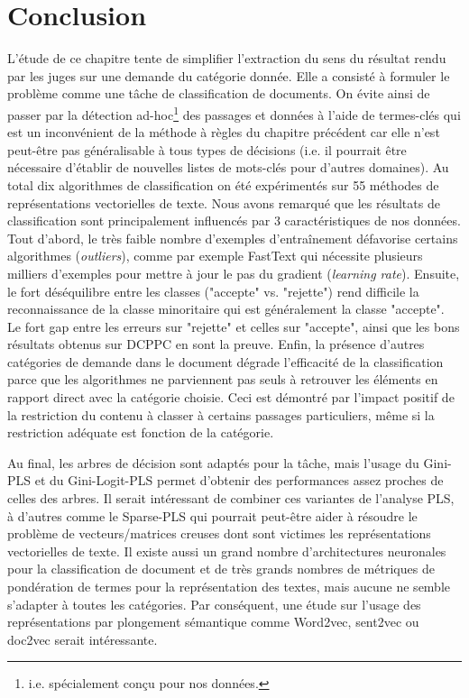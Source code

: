 \section{Conclusion}
\label{sec:sensresultat:conclusion}
L'étude de ce chapitre tente de simplifier l'extraction du sens du résultat rendu par les juges sur une demande du catégorie donnée. Elle a consisté à formuler le problème comme une tâche de classification de documents. On évite ainsi de passer par la détection ad-hoc\footnote{i.e. spécialement conçu pour nos données.} des passages et données à l'aide de termes-clés qui est un inconvénient de la méthode à règles du chapitre précédent car elle n'est peut-être pas généralisable à tous types de décisions (i.e. il pourrait être nécessaire d'établir de nouvelles listes de mots-clés pour d'autres domaines). Au total dix algorithmes de classification on été expérimentés sur 55 méthodes de représentations vectorielles de texte. Nous avons remarqué que les résultats de classification sont principalement influencés par 3 caractéristiques de nos données. Tout d'abord, le très faible nombre d'exemples d'entraînement défavorise certains algorithmes (\textit{outliers}), comme par exemple FastText qui nécessite plusieurs milliers d'exemples pour mettre à jour le pas du gradient (\textit{learning rate}). Ensuite, le fort déséquilibre entre les classes ("accepte" vs. "rejette") rend difficile la reconnaissance de la classe minoritaire qui est généralement la classe "accepte". Le fort gap entre les erreurs sur "rejette" et celles sur "accepte", ainsi que les bons résultats obtenus sur DCPPC en sont la preuve. Enfin, la présence d'autres catégories de demande dans le document dégrade l'efficacité de la classification parce que les algorithmes ne parviennent pas seuls à retrouver les éléments en rapport direct avec la catégorie choisie. Ceci est démontré par l'impact positif de la restriction du contenu à classer à certains passages particuliers, même si la restriction adéquate est fonction de la catégorie.
 
Au final, les arbres de décision sont adaptés pour la tâche, mais l'usage du Gini-PLS et du Gini-Logit-PLS permet d'obtenir des performances assez proches de celles des arbres. %
Il serait intéressant de combiner ces variantes de l'analyse PLS, à d'autres comme le Sparse-PLS qui pourrait peut-être aider à résoudre le problème de vecteurs/matrices creuses dont sont victimes les représentations vectorielles de texte. Il existe aussi un grand nombre d'architectures neuronales pour la classification de document et de très grands nombres de métriques de pondération de termes pour la représentation des textes, mais aucune ne semble s'adapter à toutes les catégories. Par conséquent, une étude sur l'usage des représentations par plongement sémantique comme Word2vec, sent2vec ou doc2vec serait intéressante.
